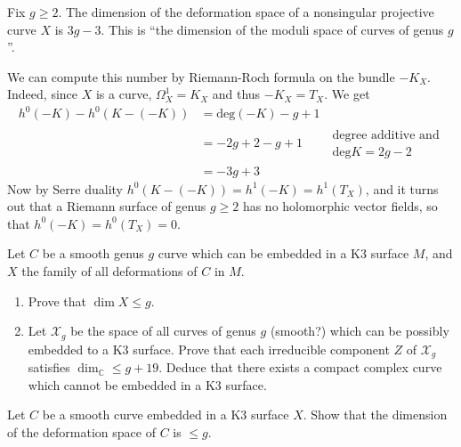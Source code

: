 \begin{example}
\label{example-moduli-space-of-nonsingular-Riemann-surfaces-of-genus-g}
\begin{reference}
\cite[Example 3.1]{continued-fractions}
\end{reference}
Fix $g \geq 2$. The dimension of the deformation space of a nonsingular
projective curve $X$ is $3g-3$. This is ``the dimension of the moduli space of
curves of genus $g$''.
 
We can compute this number by Riemann-Roch formula on the bundle $-K_X$. 
Indeed, since $X$ is a curve, $\Omega_X^1=K_X$ and thus $-K_X=T_X$. We get
\begin{align*}
h^0(-K)-h^0(K-(-K))&=\text{deg}(-K)-g+1\\
&=-2g+2-g+1\qquad \substack{\text{degree additive and}\\ \text{deg}K=2g-2}\\
&=-3g+3
\end{align*}
Now by Serre duality $h^0(K-(-K))=h^1(-K)=h^1(T_X)$, and it turns out that a
Riemann surface of genus $g \geq 2$ has no holomorphic vector fields, so that
$h^0(-K)=h^0(T_X)=0$.
\end{example}

\begin{exercise}
\label{exercise-deformations-of-curves-in-K3}
Let $C$ be a smooth genus $g$ curve which can be embedded in a K3 surface  $M$,
and $X$ the family of all deformations of $C$ in $M$.
\begin{enumerate}
\item Prove that $\dim X \leq  g$.
\item Let $\mathcal{X}_g$ be the space of all curves of genus $g$ (smooth?)
which can be possibly embedded to a K3 surface. Prove that each irreducible
component $Z$ of $\mathcal{X}_g$ satisfies $\dim_\mathbb{C} \leq  g+19$. Deduce
that there exists a compact complex curve which cannot be embedded in a K3
surface.
\end{enumerate}
\end{exercise}

\begin{exercise}
\label{exercise-}
Let $C$ be a smooth curve embedded in a K3 surface $X$. Show that the dimension
of the deformation space of $C$ is $\leq g$.
\end{exercise}

